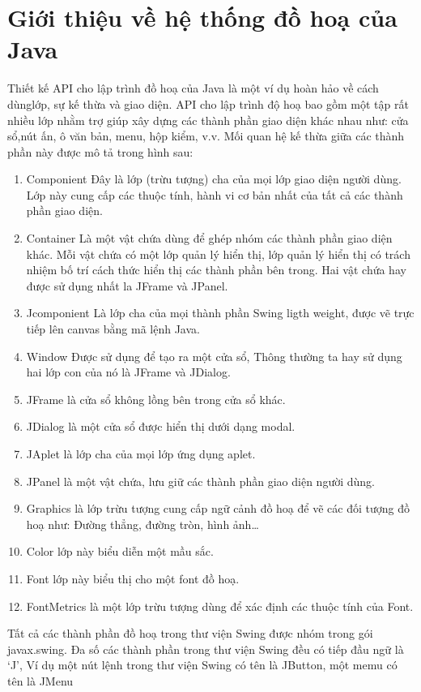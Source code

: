 \section{Giới thiệu về hệ thống đồ hoạ của Java}
Thiết kế API cho lập trình đồ hoạ của Java là một ví dụ hoàn hảo về cách dùnglớp, sự kế thừa và giao diện. API cho lập trình độ hoạ bao gồm một tập rất nhiều
lớp nhằm trợ giúp xây dựng các thành phần giao diện khác nhau như: cửa sổ,nút
ấn, ô văn bản, menu, hộp kiểm, v.v. Mối quan hệ kế thừa giữa các thành phần này
được mô tả trong hình sau:
\begin{enumerate}
	\item Componient Đây là lớp (trừu tượng) cha của mọi lớp giao diện người dùng.
Lớp này cung cấp các thuộc tính, hành vi cơ bản nhất của tất cả các thành
phần giao diện.
	\item  Container Là một vật chứa dùng để ghép nhóm các thành phần giao diện
khác. Mỗi vật chứa có một lớp quản lý hiển thị, lớp quản lý hiển thị có
trách nhiệm bố trí cách thức hiển thị các thành phần bên trong. Hai vật chứa
hay được sử dụng nhất la JFrame và JPanel.
	\item  Jcomponient Là lớp cha của mọi thành phần Swing ligth weight, được vẽ
trực tiếp lên canvas bằng mã lệnh Java.
	\item  Window Được sử dụng để tạo ra một cửa sổ, Thông thường ta hay sử dụng
hai lớp con của nó là JFrame và JDialog.
	\item  JFrame là cửa sổ không lồng bên trong cửa sổ khác.
	\item  JDialog là một cửa sổ được hiển thị dưới dạng modal.
	\item  JAplet là lớp cha của mọi lớp ứng dụng aplet.
	\item  JPanel là một vật chứa, lưu giữ các thành phần giao diện người dùng.
	\item  Graphics là lớp trừu tượng cung cấp ngữ cảnh đồ hoạ để vẽ các đối tượng
đồ hoạ như: Đường thẳng, đường tròn, hình ảnh…
	\item  Color lớp này biểu diễn một mầu sắc.
	\item  Font lớp này biểu thị cho một font đồ hoạ.
	\item  FontMetrics là một lớp trừu tượng dùng để xác định các thuộc tính của
Font.
\end{enumerate}

Tất cả các thành phần đồ hoạ trong thư viện Swing được nhóm trong gói
javax.swing. Đa số các thành phần trong thư viện Swing đều có tiếp đầu ngữ là ‘J’,
Ví dụ một nút lệnh trong thư viện Swing có tên là JButton, một memu có tên là JMenu
